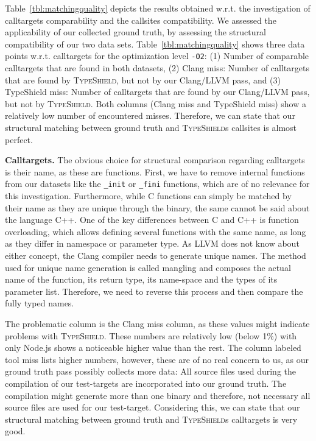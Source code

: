 Table~\ref{tbl:matchingquality} depicts the results obtained w.r.t. the investigation of calltargets comparability and the callsites compatibility.
We assessed the applicability of our collected ground truth, by assessing the structural compatibility of our two data sets. 
Table~\ref{tbl:matchingquality} shows three data points w.r.t. calltargets for the optimization level \texttt{-O2}:
(1) Number of comparable calltargets that are found in both datasets, 
(2) Clang miss: Number of calltargets that are found by \textsc{TypeShield}, but not by our Clang/LLVM pass, and 
(3) TypeShield miss: Number of calltargets that are found by our Clang/LLVM pass, but not by \textsc{TypeShield}.
Both columns (Clang miss and TypeShield miss) show a relatively low number of encountered misses. Therefore, we can 
state that our structural matching between ground truth and \textsc{TypeShield}s callsites is almost perfect.

\textbf{Calltargets.} The obvious choice for structural comparison regarding calltargets is their name, as these are functions. First, we have to remove internal 
functions from our datasets like the \texttt{\_init} or \texttt{\_fini} functions, which are of no relevance for this investigation. Furthermore, while C functions can
simply be matched by their name as they are unique through the binary, the same cannot be said about the language C++. One of the key differences between C and C++ is 
function overloading, which allows defining several functions with the same name, as long as they differ in namespace or parameter type. 
As LLVM does not know about either concept, the Clang compiler needs to generate unique names. The method used for unique name generation is called mangling and composes
the actual name of the function, its return type, its name-space and the types of its parameter list. Therefore, we need to reverse this process and then compare the fully
typed names. 

The problematic column is the Clang miss column, as these values might indicate problems with \textsc{TypeShield}. These numbers are relatively low (below 1\%) with only Node.js
shows a noticeable higher value than the rest. The column labeled tool miss lists higher numbers, however, these are of no real concern to us, as our ground truth 
pass possibly collects more data: All source files used during the compilation of our test-targets are incorporated into our ground truth. The compilation might generate more than
one binary and therefore, not necessary all source files are used for our test-target.
Considering this, we can state that our structural matching between ground truth and \textsc{TypeShield}s calltargets is very good.

